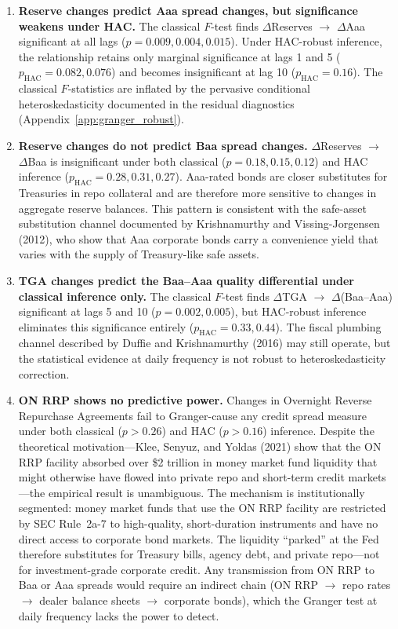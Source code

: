 \documentclass[12pt,a4paper]{article}
\begin{document}
\begin{enumerate}
  \item \textbf{Reserve changes predict Aaa spread changes, but significance weakens under HAC.} The classical $F$-test finds $\Delta$Reserves $\rightarrow$ $\Delta$Aaa significant at all lags ($p = 0.009, 0.004, 0.015$). Under HAC-robust inference, the relationship retains only marginal significance at lags 1 and 5 ($p_{\text{HAC}} = 0.082, 0.076$) and becomes insignificant at lag 10 ($p_{\text{HAC}} = 0.16$). The classical $F$-statistics are inflated by the pervasive conditional heteroskedasticity documented in the residual diagnostics (Appendix~\ref{app:granger_robust}).

  \item \textbf{Reserve changes do not predict Baa spread changes.} $\Delta$Reserves $\rightarrow$ $\Delta$Baa is insignificant under both classical ($p = 0.18, 0.15, 0.12$) and HAC inference ($p_{\text{HAC}} = 0.28, 0.31, 0.27$). Aaa-rated bonds are closer substitutes for Treasuries in repo collateral and are therefore more sensitive to changes in aggregate reserve balances. This pattern is consistent with the safe-asset substitution channel documented by Krishnamurthy and Vissing-Jorgensen (2012), who show that Aaa corporate bonds carry a convenience yield that varies with the supply of Treasury-like safe assets.

  \item \textbf{TGA changes predict the Baa--Aaa quality differential under classical inference only.} The classical $F$-test finds $\Delta$TGA $\rightarrow$ $\Delta$(Baa--Aaa) significant at lags 5 and 10 ($p = 0.002, 0.005$), but HAC-robust inference eliminates this significance entirely ($p_{\text{HAC}} = 0.33, 0.44$). The fiscal plumbing channel described by Duffie and Krishnamurthy (2016) may still operate, but the statistical evidence at daily frequency is not robust to heteroskedasticity correction.

  \item \textbf{ON RRP shows no predictive power.} Changes in Overnight Reverse Repurchase Agreements fail to Granger-cause any credit spread measure under both classical ($p > 0.26$) and HAC ($p > 0.16$) inference. Despite the theoretical motivation---Klee, Senyuz, and Yoldas (2021) show that the ON RRP facility absorbed over \$2 trillion in money market fund liquidity that might otherwise have flowed into private repo and short-term credit markets---the empirical result is unambiguous. The mechanism is institutionally segmented: money market funds that use the ON RRP facility are restricted by SEC Rule~2a-7 to high-quality, short-duration instruments and have no direct access to corporate bond markets. The liquidity ``parked'' at the Fed therefore substitutes for Treasury bills, agency debt, and private repo---not for investment-grade corporate credit. Any transmission from ON RRP to Baa or Aaa spreads would require an indirect chain (ON RRP $\rightarrow$ repo rates $\rightarrow$ dealer balance sheets $\rightarrow$ corporate bonds), which the Granger test at daily frequency lacks the power to detect.
\end{enumerate}
\end{document}
